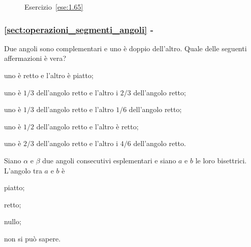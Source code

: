 \begin{inaccessibleblock}
 \begin{figure}[htb]
 \centering
 \caption{Esercizio~\ref{ese:1.65}}\label{fig:ese1.65}
\end{figure}
\end{inaccessibleblock}

\begingroup
\hypersetup{linkcolor=black}
\subsubsection*{\ref{sect:operazioni_segmenti_angoli} - 
}
\endgroup

\begin{esercizio}
\label{ese:1.66}
Due angoli sono complementari e uno è doppio dell'altro. Quale delle 
seguenti affermazioni è vera?
\begin{enumeratea}
\item uno è retto e l'altro è piatto;
\item uno è \(1/3\) dell'angolo retto e l'altro i \(2/3\) dell'angolo 
retto;
\item uno è \(1/3\) dell'angolo retto e l'altro \(1/6\) dell'angolo retto;
\item uno è \(1/2\) dell'angolo retto e l'altro è retto;
\item uno è \(2/3\) dell'angolo retto e l'altro i \(4/6\) dell'angolo 
retto.
\end{enumeratea}
\end{esercizio}

\begin{esercizio}
\label{ese:1.67}
Siano \(\alpha\) e \(\beta\) due angoli consecutivi esplementari e siano 
\(a\) e \(b\) le loro bisettrici. L'angolo tra \(a\) e \(b\) è
\begin{multicols}{2}
\begin{enumeratea}
\item piatto;
\item retto;
\item nullo;
\item non si può sapere.
\end{enumeratea}
\end{multicols}
\end{esercizio}

